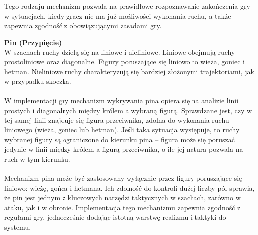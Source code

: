 \documentclass[12pt,a4paper]{article}
\begin{document}
\noindent
Tego rodzaju mechanizm pozwala na prawidłowe rozpoznawanie zakończenia gry w sytuacjach, kiedy gracz nie ma już możliwości wykonania ruchu, a także zapewnia zgodność z obowiązującymi zasadami gry.

\newpage

\noindent \textbf{Pin (Przypięcie)}\\
W szachach ruchy dzielą się na liniowe i nieliniowe. Liniowe obejmują ruchy prostoliniowe oraz diagonalne. Figury poruszające się liniowo to wieża, goniec i hetman. Nieliniowe ruchy charakteryzują się bardziej złożonymi trajektoriami, jak w przypadku skoczka.
\\\\
W implementacji gry mechanizm wykrywania pina opiera się na analizie linii prostych i diagonalnych między królem a wybraną figurą. Sprawdzane jest, czy w tej samej linii znajduje się figura przeciwnika, zdolna do wykonania ruchu liniowego (wieża, goniec lub hetman). Jeśli taka sytuacja występuje, to ruchy wybranej figury są ograniczone do kierunku pina – figura może się poruszać jedynie w linii między królem a figurą przeciwnika, o ile jej natura pozwala na ruch w tym kierunku.
\\\\
Mechanizm pina może być zastosowany wyłącznie przez figury poruszające się liniowo: wieżę, gońca i hetmana. Ich zdolność do kontroli dużej liczby pól sprawia, że pin jest jednym z kluczowych narzędzi taktycznych w szachach, zarówno w ataku, jak i w obronie. Implementacja tego mechanizmu zapewnia zgodność z regułami gry, jednocześnie dodając istotną warstwę realizmu i taktyki do systemu.
\end{document}
